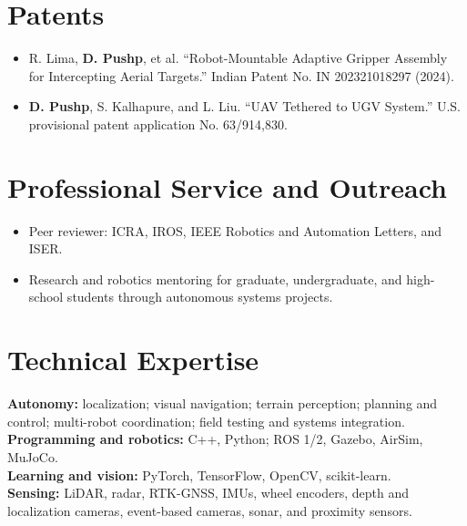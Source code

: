 \documentclass[11pt,letterpaper]{article}
\newcommand{\me}{\textbf{D. Pushp}}
\begin{document}
\section{Patents}
\begin{itemize}
\item R. Lima, \me, et al. ``Robot-Mountable Adaptive Gripper Assembly for Intercepting Aerial Targets.'' Indian Patent No. IN 202321018297 (2024).
\item \me, S. Kalhapure, and L. Liu. ``UAV Tethered to UGV System.'' U.S. provisional patent application No. 63/914,830.
\end{itemize}

\section{Professional Service and Outreach}
\begin{itemize}
\item Peer reviewer: ICRA, IROS, IEEE Robotics and Automation Letters, and ISER.
\item Research and robotics mentoring for graduate, undergraduate, and high-school students through autonomous systems projects.
\end{itemize}

\section{Technical Expertise}
\textbf{Autonomy:} localization; visual navigation; terrain perception; planning and control; multi-robot coordination; field testing and systems integration.\\
\textbf{Programming and robotics:} C++, Python; ROS 1/2, Gazebo, AirSim, MuJoCo.\\
\textbf{Learning and vision:} PyTorch, TensorFlow, OpenCV, scikit-learn.\\
\textbf{Sensing:} LiDAR, radar, RTK-GNSS, IMUs, wheel encoders, depth and localization cameras, event-based cameras, sonar, and proximity sensors.

\end{document}
